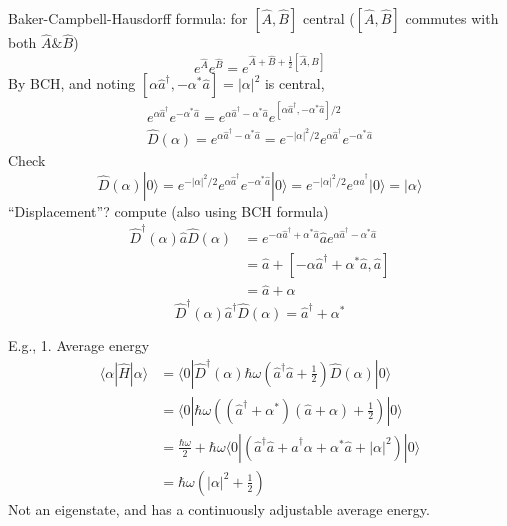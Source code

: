 Baker-Campbell-Hausdorff formula: for $[\hat{A},\hat{B}]$ central ($[\hat{A},\hat{B}]$ commutes with both $\hat{A}\&\hat{B}$)
\[ e^{\hat{A}}e^{\hat{B}}=e^{\hat{A}+\hat{B}+\frac{1}{2}\left[ \hat{A},\hat{B} \right]}\]
By BCH, and noting $\left[ \alpha \hat{a}^{\dagger},-\alpha ^*\hat{a} \right] =\left| \alpha \right|^2$ is central,
\begin{gather*}
    e^{\alpha \hat{a}^{\dagger}}e^{-\alpha ^*\hat{a}}=e^{\alpha \hat{a}^{\dagger}-\alpha ^*\hat{a}}e^{\left[ \alpha \hat{a}^{\dagger},-\alpha ^*\hat{a} \right] /2}\\
    \hat{D}\left( \alpha \right) =e^{\alpha \hat{a}^{\dagger}-\alpha ^*\hat{a}}=e^{-\left| \alpha \right|^2/2}e^{\alpha \hat{a}^{\dagger}}e^{-\alpha ^*\hat{a}}
\end{gather*}
Check
\[ \hat{D}\left( \alpha \right) |0\rangle =e^{-\left| \alpha \right|^2/2}e^{\alpha \hat{a}^{\dagger}}e^{-\alpha ^*\hat{a}}|0\rangle =e^{-\left| \alpha \right|^2/2}e^{\alpha \hat{a}^{\dagger}}|0\rangle =|\alpha \rangle \]
``Displacement''? compute (also using BCH formula)
\begin{align*}
    \hat{D}^{\dagger}\left( \alpha \right) \hat{a}\hat{D}\left( \alpha \right) &=e^{-\alpha \hat{a}^{\dagger}+\alpha ^*\hat{a}}\hat{a}e^{\alpha \hat{a}^{\dagger}-\alpha ^*\hat{a}}\\
    &=\hat{a}+\left[ -\alpha \hat{a}^{\dagger}+\alpha ^*\hat{a},\hat{a} \right] \\
    &=\hat{a}+\alpha
\end{align*}
\[ \hat{D}^{\dagger}\left( \alpha \right) \hat{a}^{\dagger}\hat{D}\left( \alpha \right) =\hat{a}^{\dagger}+\alpha ^*\]

E.g., 1. Average energy
\begin{align*}
    \langle \alpha |\hat{H}|\alpha \rangle &=\langle 0|\hat{D}^{\dagger}\left( \alpha \right) \hbar \omega \left( \hat{a}^{\dagger}\hat{a}+\frac{1}{2} \right) \hat{D}\left( \alpha \right) |0\rangle \\
    &=\langle 0|\hbar \omega \left( \left( \hat{a}^{\dagger}+\alpha ^* \right) \left( \hat{a}+\alpha \right) +\frac{1}{2} \right) |0\rangle \\
    &=\frac{\hbar \omega}{2}+\hbar \omega \langle 0|\left( \hat{a}^{\dagger}\hat{a}+\hat{a}^{\dagger}\alpha +\alpha ^*\hat{a}+\left| \alpha \right|^2 \right) |0\rangle \\
    &=\hbar \omega \left( \left| \alpha \right|^2+\frac{1}{2} \right)
\end{align*}
Not an eigenstate, and has a continuously adjustable average energy.

